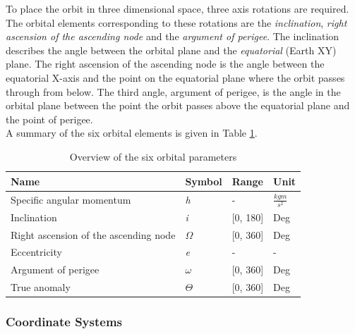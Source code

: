 To place the orbit in three dimensional space, three axis rotations are required. The orbital elements corresponding to these rotations are the \textit{inclination}, \textit{right ascension of the ascending node} and the \textit{argument of perigee}. The inclination describes the angle between the orbital plane and the \textit{equatorial} (Earth XY) plane. The right ascension of the ascending node is the angle between the equatorial X-axis and the point on the equatorial plane where the orbit passes through from below. The third angle, argument of perigee, is the angle in the orbital plane between the point the orbit passes above the equatorial plane and the point of perigee. \\


A summary of the six orbital elements is given in Table \ref{table:orbital_parameters}. \\


\begin{table}[h]
\centering
\begin{tabular}{@{}llll@{}}
\toprule
Name                                  & Symbol              & Range     & Unit \\ \midrule
Specific angular momentum             & \textit{h}          & -         & $\frac{kgm}{s^2}$ \\
Inclination                           & \textit{i}          & [0, 180]  & Deg    \\
Right ascension of the ascending node & $\mathit{\Omega}$   & [0, 360]  & Deg  \\
Eccentricity                          & \textit{e}          & -         & -    \\
Argument of perigee                   & $\mathit{\omega}$   & [0, 360]  & Deg  \\
True anomaly                          & $\mathit{\Theta}$   & [0, 360]  & Deg  \\ \bottomrule
\end{tabular}
\caption{Overview of the six orbital parameters}
\label{table:orbital_parameters}
\end{table}


\subsubsection{Coordinate Systems}

